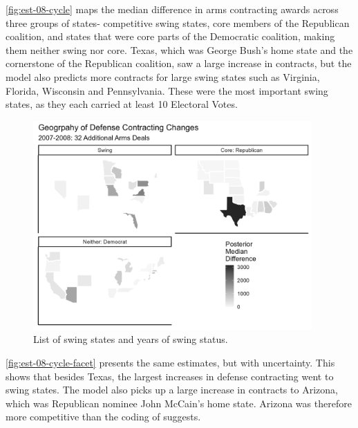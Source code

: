 \documentclass[12pt]{article}
\begin{document}
\autoref{fig:est-08-cycle} maps the median difference in arms contracting awards across three groups of states- competitive swing states, core members of the Republican coalition, and states that were core parts of the Democratic coalition, making them neither swing nor core. 
Texas, which was George Bush's home state and the cornerstone of the Republican coalition, saw a large increase in contracts, but the model also predicts more contracts for large swing states such as Virginia, Florida, Wisconsin and Pennsylvania. 
These were the most important swing states, as they each carried at least 10 Electoral Votes. 


\begin{figure}[htpb]
	\centering
		\includegraphics[width=0.95\textwidth]{est-08-cycle.png}
	\caption{List of swing states and years of swing status.}
	\label{fig:est-08-cycle}
\end{figure}


\autoref{fig:est-08-cycle-facet} presents the same estimates, but with uncertainty. 
This shows that besides Texas, the largest increases in defense contracting went to swing states. 
The model also picks up a large increase in contracts to Arizona, which was Republican nominee John McCain's home state.
Arizona was therefore more competitive than the coding of \citet{KrinerReeves2015} suggests. 
\end{document}
